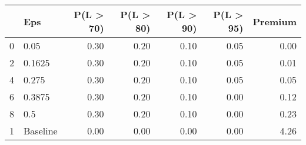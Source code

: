 \begin{tabular}{llrrrrr}
\toprule
{} &       Eps &  P(L > 70) &  P(L > 80) &  P(L > 90) &  P(L > 95) &  Premium \\
\midrule
0 &      0.05 &       0.30 &       0.20 &       0.10 &       0.05 &     0.00 \\
2 &    0.1625 &       0.30 &       0.20 &       0.10 &       0.05 &     0.01 \\
4 &     0.275 &       0.30 &       0.20 &       0.10 &       0.05 &     0.05 \\
6 &    0.3875 &       0.30 &       0.20 &       0.10 &       0.00 &     0.12 \\
8 &       0.5 &       0.30 &       0.20 &       0.10 &       0.00 &     0.23 \\
1 &  Baseline &       0.00 &       0.00 &       0.00 &       0.00 &     4.26 \\
\bottomrule
\end{tabular}
